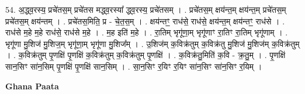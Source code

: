 \documentclass[17pt]{extarticle}
\begin{document}
54. अ॒द्ध्व॒रस्य॒ प्रचे॑तस॒म् प्रचे॑तस मद्ध्व॒रस्या᳚ द्ध्व॒रस्य॒ प्रचे॑तसम् । . प्रचे॑तस॒म् क्षय॑न्त॒म् क्षय॑न्त॒म् प्रचे॑तस॒म् प्रचे॑तस॒म् क्षय॑न्तम् । . प्रचे॑तस॒मिति॒ प्र - चे॒त॒स॒म् । . क्षय॑न्तꣳ॒॒ राध॑से॒ राध॑से॒ क्षय॑न्त॒म् क्षय॑न्तꣳ॒॒ राध॑से । . राध॑से म॒हे म॒हे राध॑से॒ राध॑से म॒हे । . म॒ह इति॑ म॒हे । . रा॒तिम् भृगू॑णा॒म् भृगू॑णाꣳ रा॒तिꣳ रा॒तिम् भृगू॑णाम् । . भृगू॑णा मु॒शिज॑ मु॒शिज॒म् भृगू॑णा॒म् भृगू॑णा मु॒शिज᳚म् । . उ॒शिज॑म् क॒विक्र॑तुम् क॒विक्र॑तु मु॒शिज॑ मु॒शिज॑म् क॒विक्र॑तुम् । . क॒विक्र॑तुम् पृ॒णक्षि॑ पृ॒णक्षि॑ क॒विक्र॑तुम् क॒विक्र॑तुम् पृ॒णक्षि॑ । . क॒विक्र॑तु॒मिति॑ क॒वि - क्र॒तु॒म् । . पृ॒णक्षि॑ सान॒सिꣳ सा॑न॒सिम् पृ॒णक्षि॑ पृ॒णक्षि॑ सान॒सिम् । . सा॒न॒सिꣳ र॒यिꣳ र॒यिꣳ सा॑न॒सिꣳ सा॑न॒सिꣳ र॒यिम् । \newline

\textbf{Ghana Paata } \newline
\end{document}

